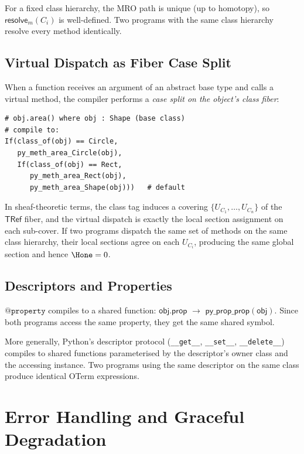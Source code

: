 \begin{proposition}
For a fixed class hierarchy, the MRO path is unique (up to
homotopy), so $\mathsf{resolve}_m(C_i)$ is well-defined.
Two programs with the same class hierarchy resolve every method
identically.
\end{proposition}

\section{Virtual Dispatch as Fiber Case Split}

When a function receives an argument of an abstract base type and
calls a virtual method, the compiler performs a \emph{case split on
the object's class fiber}:

\begin{lstlisting}[caption={Virtual dispatch compilation}]
# obj.area() where obj : Shape (base class)
# compile to:
If(class_of(obj) == Circle,
   py_meth_area_Circle(obj),
   If(class_of(obj) == Rect,
      py_meth_area_Rect(obj),
      py_meth_area_Shape(obj)))   # default
\end{lstlisting}

In sheaf-theoretic terms, the class tag induces a covering
$\{U_{C_1}, \ldots, U_{C_n}\}$ of the $\mathsf{TRef}$ fiber,
and the virtual dispatch is exactly the local section assignment
on each sub-cover.  If two programs dispatch the same set of
methods on the same class hierarchy, their local sections agree
on each $U_{C_i}$, producing the same global section and hence
$\Hone = 0$.

\section{Descriptors and Properties}

$\texttt{@property}$ compiles to a shared function:
$\mathsf{obj.prop}$ $\to$ $\mathsf{py\_prop\_prop}(\mathsf{obj})$.
Since both programs access the same property, they get the same
shared symbol.

More generally, Python's descriptor protocol (\texttt{\_\_get\_\_},
\texttt{\_\_set\_\_}, \texttt{\_\_delete\_\_}) compiles to shared
functions parameterised by the descriptor's owner class and the
accessing instance.  Two programs using the same descriptor on the
same class produce identical OTerm expressions.


\chapter{Error Handling and Graceful Degradation}
\label{ch:errors}

